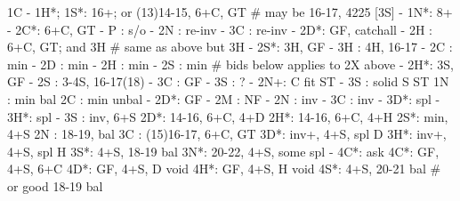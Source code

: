 1C - 1H*;
1S*: 16+; or (13)14-15, 6+C, GT  # may be 16-17, 4225 [3S]
   - 1N*: 8+
        - 2C*: 6+C, GT
             - P  : s/o
             - 2N : re-inv
             - 3C : re-inv
        - 2D*: GF, catchall
        - 2H : 6+C, GT; and 3H  # same as above but 3H
        - 2S*: 3H, GF
        - 3H : 4H, 16-17
   - 2C : min
   - 2D : min
   - 2H : min
   - 2S : min 
   # bids below applies to 2X above
        - 2H*: 3S, GF
        - 2S : 3-4S, 16-17(18)
        - 3C : GF
        - 3S : ?
   - 2N+: C fit ST
   - 3S : solid S ST
1N : min bal
2C : min unbal
   - 2D*: GF
   - 2M : NF
   - 2N : inv
   - 3C : inv
   - 3D*: spl
   - 3H*: spl
   - 3S : inv, 6+S
2D*: 14-16, 6+C, 4+D
2H*: 14-16, 6+C, 4+H 
2S*: min, 4+S
2N : 18-19, bal
3C : (15)16-17, 6+C, GT
3D*: inv+, 4+S, spl D
3H*: inv+, 4+S, spl H
3S*: 4+S, 18-19 bal
3N*: 20-22, 4+S, some spl
   - 4C*: ask
4C*: GF, 4+S, 6+C
4D*: GF, 4+S, D void 
4H*: GF, 4+S, H void 
4S*: 4+S, 20-21 bal  # or good 18-19 bal